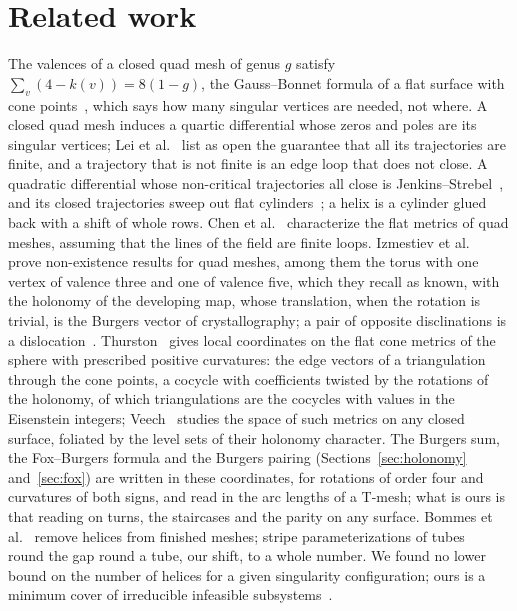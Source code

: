 \documentclass[11pt,a4paper]{article}
\begin{document}
\section{Related work}\label{sec:related}

The valences of a closed quad mesh of genus $g$ satisfy $\sum_v (4 - k(v)) = 8(1-g)$,
the Gauss--Bonnet formula of a flat surface with cone
points~\cite{troyanov1986surfaces}, which says how many singular vertices are
needed, not where. A closed quad mesh induces a quartic differential
whose zeros and poles are its singular vertices; Lei et
al.~\cite{lei2020quartic} list as open the guarantee that all its
trajectories are finite, and a trajectory that is not finite is an edge loop
that does not close. A quadratic
differential whose non-critical trajectories all close is
Jenkins--Strebel~\cite[\S20.1]{strebel1984quadratic}, and its closed
trajectories sweep out flat cylinders~\cite[\S\S9.3, 20.2]{strebel1984quadratic}; a
helix is a cylinder glued back with a shift of whole rows. Chen et
al.~\cite{chen2019metric} characterize the flat metrics of quad meshes,
assuming that the lines of the field are finite loops. Izmestiev et al.~\cite{izmestiev2013torus} prove non-existence results for quad meshes,
among them the torus with one vertex of valence three and one of valence
five, which they recall as known, with the holonomy of the developing map,
whose translation, when the rotation is trivial, is the Burgers vector of
crystallography; a pair of opposite disclinations is a
dislocation~\cite{kleman2008disclinations}. Thurston~\cite{thurston1998shapes}
gives local coordinates on the flat cone metrics of the sphere with
prescribed positive curvatures: the edge vectors of a triangulation through
the cone points, a cocycle with coefficients twisted by the rotations of the
holonomy, of which triangulations are the cocycles with values in the
Eisenstein integers; Veech~\cite{veech1993flat} studies the space of such
metrics on any closed surface, foliated by the level sets of their holonomy
character. The
Burgers sum, the Fox--Burgers formula and the Burgers pairing
(Sections~\ref{sec:holonomy} and~\ref{sec:fox}) are written in these
coordinates, for rotations of order four and curvatures of both signs, and
read in the arc lengths of a T-mesh; what is ours is that reading on turns,
the staircases and the parity on any surface. Bommes et
al.~\cite{bommes2011structure} remove helices from finished meshes; stripe
parameterizations of tubes~\cite{kalberer2011stripe} round the gap round a
tube, our shift, to a whole number. We found no lower bound on the number of helices for a given
singularity configuration; ours is a minimum cover of irreducible infeasible
subsystems~\cite{parker1996iis,amaldi2003maxfs}.
\end{document}
